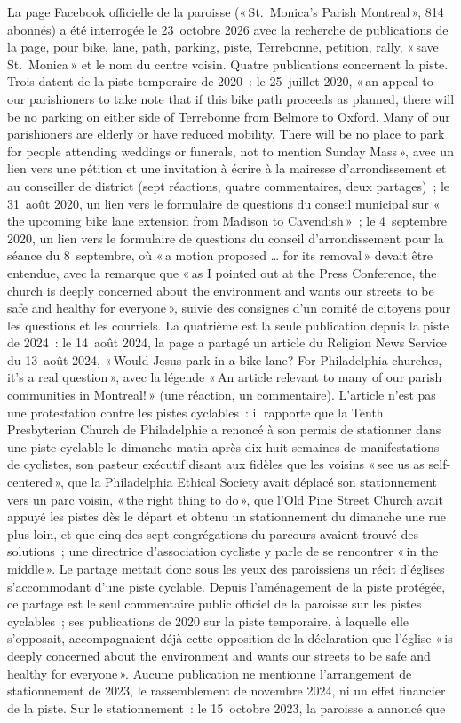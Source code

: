 \documentclass[11pt,letterpaper]{article}
\begin{document}
La page Facebook officielle de la paroisse («\,St.~Monica's Parish Montreal\,», 814 abonnés) a été interrogée le 23~octobre 2026 avec la recherche de publications de la page, pour bike, lane, path, parking, piste, Terrebonne, petition, rally, «\,save St.~Monica\,» et le nom du centre voisin. Quatre publications concernent la piste. Trois datent de la piste temporaire de 2020~: le 25~juillet 2020, «\,an appeal to our parishioners to take note that if this bike path proceeds as planned, there will be no parking on either side of Terrebonne from Belmore to Oxford. Many of our parishioners are elderly or have reduced mobility. There will be no place to park for people attending weddings or funerals, not to mention Sunday Mass\,», avec un lien vers une pétition et une invitation à écrire à la mairesse d'arrondissement et au conseiller de district (sept réactions, quatre commentaires, deux partages)~; le 31~août 2020, un lien vers le formulaire de questions du conseil municipal sur «\,the upcoming bike lane extension from Madison to Cavendish\,»~; le 4~septembre 2020, un lien vers le formulaire de questions du conseil d'arrondissement pour la séance du 8~septembre, où «\,a motion proposed … for its removal\,» devait être entendue, avec la remarque que «\,as I pointed out at the Press Conference, the church is deeply concerned about the environment and wants our streets to be safe and healthy for everyone\,», suivie des consignes d'un comité de citoyens pour les questions et les courriels. La quatrième est la seule publication depuis la piste de 2024~: le 14~août 2024, la page a partagé un article du Religion News Service du 13~août 2024, «\,Would Jesus park in a bike lane? For Philadelphia churches, it's a real question\,», avec la légende «\,An article relevant to many of our parish communities in Montreal!\,» (une réaction, un commentaire). L'article n'est pas une protestation contre les pistes cyclables~: il rapporte que la Tenth Presbyterian Church de Philadelphie a renoncé à son permis de stationner dans une piste cyclable le dimanche matin après dix-huit semaines de manifestations de cyclistes, son pasteur exécutif disant aux fidèles que les voisins «\,see us as self-centered\,», que la Philadelphia Ethical Society avait déplacé son stationnement vers un parc voisin, «\,the right thing to do\,», que l'Old Pine Street Church avait appuyé les pistes dès le départ et obtenu un stationnement du dimanche une rue plus loin, et que cinq des sept congrégations du parcours avaient trouvé des solutions~; une directrice d'association cycliste y parle de se rencontrer «\,in the middle\,». Le partage mettait donc sous les yeux des paroissiens un récit d'églises s'accommodant d'une piste cyclable. Depuis l'aménagement de la piste protégée, ce partage est le seul commentaire public officiel de la paroisse sur les pistes cyclables~; ses publications de 2020 sur la piste temporaire, à laquelle elle s'opposait, accompagnaient déjà cette opposition de la déclaration que l'église «\,is deeply concerned about the environment and wants our streets to be safe and healthy for everyone\,». Aucune publication ne mentionne l'arrangement de stationnement de 2023, le rassemblement de novembre 2024, ni un effet financier de la piste. Sur le stationnement~: le 15~octobre 2023, la paroisse a annoncé que 
\end{document}
